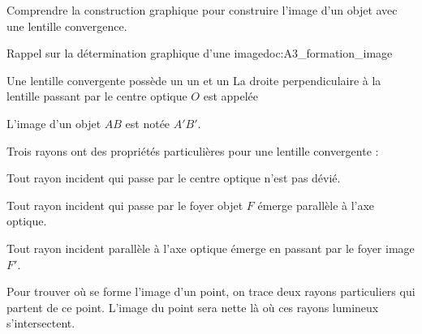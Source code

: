 \teteSndLumi

\vspace*{-30pt}


\begin{objectifs}
  \item Comprendre la construction graphique pour construire l'image d'un objet avec une lentille convergence.
\end{objectifs}


\begin{doc}{Rappel sur la détermination graphique d'une image}{doc:A3_formation_image}
  \begin{importants}
    Une lentille convergente possède un  un et un 
    La droite perpendiculaire à la lentille passant par le centre optique $O$ est appelée 
  \end{importants}
  L'image d'un objet $AB$ est notée $A'B'$.
  
  \begin{center}
  \end{center}
  
  \begin{importants}
    Trois rayons ont des propriétés particulières pour une lentille convergente :
  \begin{listePoints}
    \item Tout rayon incident qui passe par le centre optique n'est pas dévié.
    \item Tout rayon incident qui passe par le foyer objet $F$ émerge parallèle à l'axe optique.
    \item Tout rayon incident parallèle à l'axe optique émerge en passant par le foyer image $F'$.
  \end{listePoints}
  \end{importants}
  Pour trouver où se forme l'image d'un point, on trace deux rayons particuliers qui partent de ce point. 
  L'image du point sera nette là où ces rayons lumineux s'intersectent.
\end{doc}

